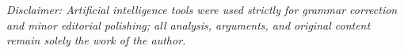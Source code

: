 \setcounter{tocdepth}{2}
\tableofcontents
\vfill
{\small\textit{Disclaimer: Artificial intelligence tools were used strictly for grammar correction and minor editorial polishing; all analysis, arguments, and original content remain solely the work of the author.}}
\newpage
